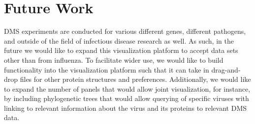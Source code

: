 \documentclass[sigchi]{acmart}
\begin{document}
\section{Future Work}

DMS experiments are conducted for various different genes, different pathogens, and outside of the field of infectious disease research as well.
As such, in the future we would like to expand this visualization platform to accept data sets other than from influenza.
To facilitate wider use, we would like to build functionality into the visualization platform such that it can take in drag-and-drop files for other protein structures and preferences.
Additionally, we would like to expand the number of panels that would allow joint visualization, for instance, by including phylogenetic trees that would allow querying of specific viruses with linking to relevant information about the virus and its proteins to relevant DMS data.



\end{document}
